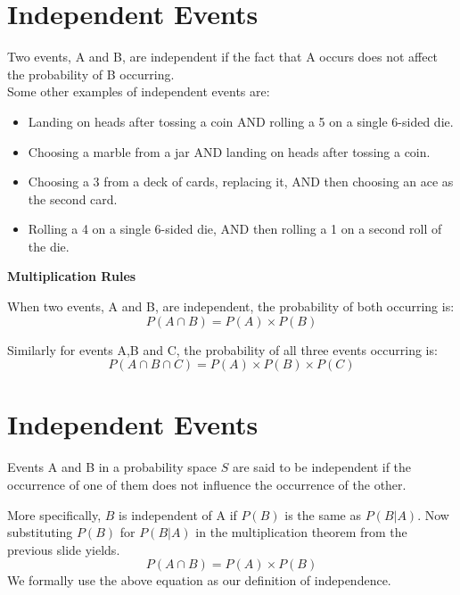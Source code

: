 \documentclass[]{report}
\begin{document}


\section{Independent Events}


Two events, A and B, are independent if the fact that A occurs does not affect the probability of B occurring.\\

Some other examples of independent events are:

\begin{itemize}
\item Landing on heads after tossing a coin AND rolling a 5 on a single 6-sided die.
\item Choosing a marble from a jar AND landing on heads after tossing a coin.
\item Choosing a 3 from a deck of cards, replacing it, AND then choosing an ace as the second card.
\item Rolling a 4 on a single 6-sided die, AND then rolling a 1 on a second roll of the die.
\end{itemize}



\noindent \textbf{Multiplication Rules}   

When two events, A and B, are independent, the probability of both occurring is:
\[ P(A \cap B) = P(A) \times P(B)\]

Similarly for events A,B and C, the probability of all three events occurring is:
\[ P(A \cap B \cap C) = P(A) \times P(B) \times P(C) \]


\section{Independent Events}
Events A and B in a probability space $S$ are said to be independent if the
occurrence of one of them does not influence the occurrence of the other.\\ \bigskip

More specifically, $B$ is independent of A if $P(B)$ is the same as $P(B|A)$. Now
substituting $P(B)$ for $P(B|A)$ in the multiplication theorem from the previous
slide yields.
\[ P(A\cap B) = P(A)\times P(B)\]
We formally use the above equation as our definition of independence.
\end{document}
